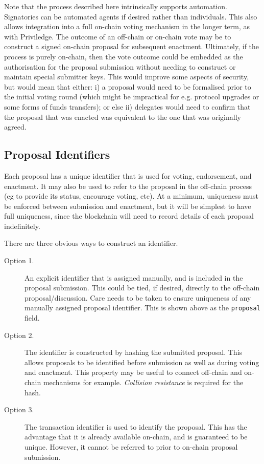 Note that the process described here intrinsically supports automation.  Signatories can be automated agents if desired rather than individuals.  This also allows integration into a full on-chain voting mechanism in the longer term, as with Priviledge.  The outcome of an off-chain or on-chain vote may be to construct a signed on-chain proposal for subsequent enactment.  Ultimately, if the process is purely on-chain, then the vote outcome could be embedded as the authorisation for the proposal submission without needing to construct or maintain special submitter keys.  This would improve some aspects of security, but would mean that either: i) a proposal would need to be formalised prior to the initial voting round (which might be impractical for e.g. protocol upgrades or some forms of funds transfers); or else ii) delegates would need to confirm that the proposal that was enacted was equivalent to the one that was originally agreed.


\subsection{Proposal Identifiers}
\label{sect:proposalid}

Each proposal has a unique identifier that is used for voting, endorsement, and enactment.  It may also be used to refer to the proposal in the off-chain process (eg to provide its
status, encourage voting, etc).  At a minimum, uniqueness must be enforced between submission and enactment, but it will be simplest to have full uniqueness, since the blockchain will need to record
details of each proposal indefinitely.

There are three obvious ways to construct an identifier.

\begin{description}
\item
  [Option 1.]
  An explicit identifier that is assigned manually, and is included in the proposal submission.  This could be tied, if desired, directly to the off-chain proposal/discussion.
  Care needs to be taken to ensure uniqueness of any manually assigned proposal identifier.  This is shown above as the \texttt{proposal} field.
\item
  [Option 2.]
  The identifier is constructed by hashing the submitted proposal.  This allows proposals to be identified before submission as well as during voting and enactment.  This property may be
  useful to connect off-chain and on-chain mechanisms for example.  \emph{Collision resistance} is required for the hash. 
\item
  [Option 3.]
  The transaction identifier is used to identify the proposal.  This has the advantage that it is already available on-chain, and is guaranteed to be unique.  However, it cannot be
  referred to prior to on-chain proposal submission.
\end{description}

